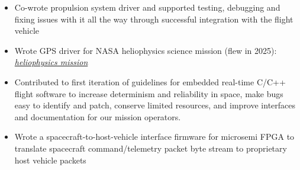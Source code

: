 \documentclass[10pt,a4paper,sans,unicode,colorlinks,urlcolor=blue]{moderncv} %
\begin{document}
{\begin{itemize}
\item Co-wrote propulsion system driver and supported testing, debugging and fixing issues with it all the way through successful integration with the flight vehicle
\item Wrote GPS driver for NASA heliophysics science mission (flew in 2025): \emph{\href{https://spacenews.com/millennium-space-delivers-two-spacecraft-for-upcoming-nasa-mission/}{heliophysics mission}}
\item Contributed to first iteration of guidelines for embedded real-time C/C++ flight software to increase determinism and reliability in space, make bugs easy to identify and patch, conserve limited resources, and improve interfaces and documentation for our mission operators.
\item Wrote a spacecraft-to-host-vehicle interface firmware for microsemi FPGA to translate spacecraft command/telemetry packet byte stream to proprietary host vehicle packets
\end{itemize}}

\end{document}
